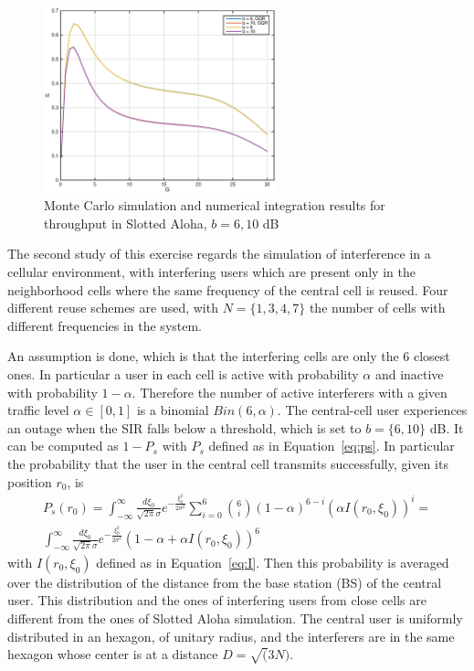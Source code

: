 \documentclass[10pt]{article}
\begin{document}
\begin{figure}[h!]
  \centering
  \includegraphics[width = 0.6\textwidth]{aloha_GQR_S}
  \caption{Monte Carlo simulation and numerical integration results for throughput in Slotted Aloha, $b = 6, 10$ dB}
  \label{fig:aloha_GQR_S}
\end{figure}

The second study of this exercise regards the simulation of interference in a cellular environment, with interfering users which are present only in the neighborhood cells where the same frequency of the central cell is reused. Four different reuse schemes are used, with $N = \{1, 3, 4, 7\}$ the number of cells with different frequencies in the system.

An assumption is done, which is that the interfering cells are only the 6 closest ones. In particular a user in each cell is active with probability $\alpha$ and inactive with probability $1-\alpha$. Therefore the number of active interferers with a given traffic level $\alpha \in [0,1]$ is a binomial $Bin(6, \alpha)$. The central-cell user experiences an outage when the SIR falls below a threshold, which is set to $b = \{6, 10\}$ dB. It can be computed as $1 - P_{s}$ with $P_{s}$ defined as in Equation~\eqref{eq:ps}. In particular the probability that the user in the central cell transmits successfully, given its position $r_0$, is 
\begin{eqnarray}
  P_s(r_0) = \int_{-\infty}^{\infty} \frac{d\xi_0}{\sqrt{2\pi}\sigma} e^{-\frac{\xi_0^2}{2\sigma^2}} 
  \sum_{i = 0}^{6} \binom{6}{i} (1 - \alpha)^{6-i} \left(\alpha I(r_0, \xi_0) \right)^{i} = \\
  \int_{-\infty}^{\infty} \frac{d\xi_0}{\sqrt{2\pi}\sigma} e^{-\frac{\xi_0^2}{2\sigma^2}} (1 - \alpha + \alpha I(r_0, \xi_0))^6
  \label{eq:succ_cell}
\end{eqnarray}
with $I(r_0, \xi_0)$ defined as in Equation~\eqref{eq:I}. Then this probability is averaged over the distribution of the distance from the base station (BS) of the central user. This distribution and the ones of interfering users from close cells are different from the ones of Slotted Aloha simulation. The central user is uniformly distributed in an hexagon, of unitary radius, and the interferers are in the same hexagon whose center is at a distance $D = \sqrt(3N)$. 
\end{document}

